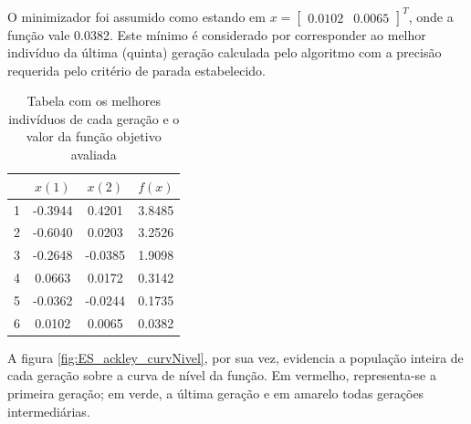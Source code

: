 \documentclass[conference,compsoc]{IEEEtran}
\begin{document}
O minimizador foi assumido como estando em $x= \begin{bmatrix}0.0102&0.0065\end{bmatrix}^T$, onde a função vale 0.0382. Este mínimo é considerado por corresponder ao melhor indivíduo da última  (quinta) geração calculada pelo algoritmo com a precisão requerida pelo critério de parada estabelecido.

\begin{table}[!htcb]
  \centering
  \begin{tabular}{|c|c|c|c|}
    \hline
    \rowcolor{kugray5}
		    &     $x(1)$   &       $x(2)$   &    $f(x)$     \\ \hline
	\cellcolor{kugray5}1   &    -0.3944   &   	   0.4201	&    3.8485     \\ \hline
    \rowcolor{kugray5}
		2   &    -0.6040   &       0.0203	&    3.2526     \\ \hline
	\cellcolor{kugray5}3   &    -0.2648   &      -0.0385	&    1.9098     \\ \hline
    \rowcolor{kugray5}
	 	4  &    0.0663	   &      0.0172	&    0.3142     \\ \hline
    \cellcolor{kugray5}5   &    -0.0362   &     -0.0244	&    0.1735     \\ \hline
    \rowcolor{kugray5}
		6   &    0.0102	   &      0.0065	&    0.0382     \\ \hline  
		\end{tabular}
  \caption{Tabela com os melhores indivíduos de cada geração e o valor da função objetivo avaliada}
  \label{fig:table}
\end{table}

A figura \ref{fig:ES_ackley_curvNivel}, por sua vez, evidencia a população inteira de cada geração sobre a curva de nível da função. Em vermelho, representa-se a primeira geração; em verde, a última geração e em amarelo todas gerações intermediárias.
\end{document}
